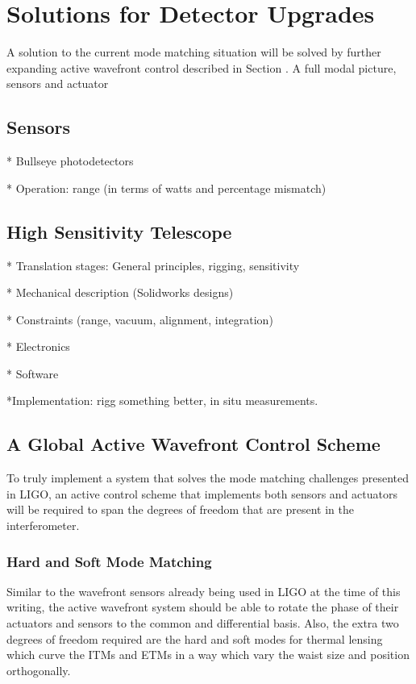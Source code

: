 \chapter{Solutions for Detector Upgrades} 
A solution to the current mode matching situation will be solved by further expanding active wavefront control described in Section \cite{AWC_current}. A full modal picture, sensors and actuator
	\section{Sensors}
* Bullseye photodetectors

* Operation: range (in terms of watts and percentage mismatch)


	\section{High Sensitivity Telescope}
	* Translation stages: General principles, rigging, sensitivity
	
	* Mechanical description (Solidworks designs)
	
	* Constraints (range, vacuum, alignment, integration)

	* Electronics 
	
	* Software
	
	*Implementation: rigg something better, in situ measurements.
	
	\section{A Global Active Wavefront Control Scheme}
	To truly implement a system that solves the mode matching challenges presented in LIGO, an active control scheme that implements both sensors and actuators will be required to span the degrees of freedom that are present in the interferometer.
	
	\subsection{Hard and Soft Mode Matching}
	Similar to the wavefront sensors already being used in LIGO at the time of this writing, the active wavefront system should be able to rotate the phase of their actuators and sensors to the common and differential basis.  Also, the extra two degrees of freedom required are the hard and soft modes for thermal lensing which curve the ITMs and ETMs in a way which vary the waist size and position orthogonally. 